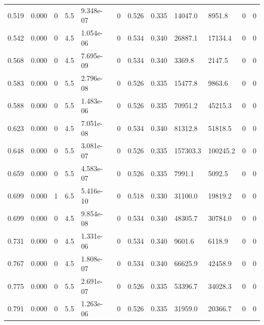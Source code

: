 \documentclass[preview]{standalone}
\begin{document}
{{\begin{tabular}{L{1.2cm}C{1.2cm} C{0.3cm}C{0.5cm} C{1.4cm}C{1.4cm} C{1.4cm}C{1.4cm} C{1.6cm}C{1.6cm} C{1.6cm}C{1.6cm}}
  0.519  &  0.000  & 0     & 5.5 &  9.348e-07  & 0  &  0.526&   0.335& 14047.0 & 8951.8   &  0 & 0  \\ 
  0.542  &  0.000  & 0     & 4.5 &  1.054e-06  & 0  &  0.534&   0.340& 26887.1 & 17134.4   &  0 & 0  \\ 
  0.568  &  0.000  & 0     & 4.5 &  7.695e-09  & 0  &  0.534&   0.340& 3369.8 & 2147.5   &  0 & 0  \\ 
  0.583  &  0.000  & 0     & 5.5 &  2.796e-08  & 0  &  0.526&   0.335& 15477.8 & 9863.6   &  0 & 0  \\ 
  0.588  &  0.000  & 0     & 5.5 &  1.483e-06  & 0  &  0.526&   0.335& 70951.2 & 45215.3   &  0 & 0  \\ 
  0.623  &  0.000  & 0     & 4.5 &  7.051e-08  & 0  &  0.534&   0.340& 81312.8 & 51818.5   &  0 & 0  \\ 
  0.648  &  0.000  & 0     & 5.5 &  3.081e-07  & 0  &  0.526&   0.335& 157303.3 & 100245.2   &  0 & 0  \\ 
  0.659  &  0.000  & 0     & 5.5 &  4.583e-07  & 0  &  0.526&   0.335& 7991.1 & 5092.5   &  0 & 0  \\ 
  0.699  &  0.000  & 1     & 6.5 &  5.416e-10  & 0  &  0.518&   0.330& 31100.0 & 19819.2   &  0 & 0  \\ 
  0.699  &  0.000  & 0     & 4.5 &  9.854e-08  & 0  &  0.534&   0.340& 48305.7 & 30784.0   &  0 & 0  \\ 
  0.731  &  0.000  & 0     & 4.5 &  1.331e-06  & 0  &  0.534&   0.340& 9601.6 & 6118.9   &  0 & 0  \\ 
  0.767  &  0.000  & 0     & 4.5 &  1.808e-07  & 0  &  0.534&   0.340& 66625.9 & 42458.9   &  0 & 0  \\ 
  0.775  &  0.000  & 0     & 5.5 &  2.691e-07  & 0  &  0.526&   0.335& 53396.7 & 34028.3   &  0 & 0  \\ 
  0.791  &  0.000  & 0     & 5.5 &  1.263e-06  & 0  &  0.526&   0.335& 31959.0 & 20366.7   &  0 & 0  \\ 
\hline 
\end{tabular} 

}}
\end{document}

